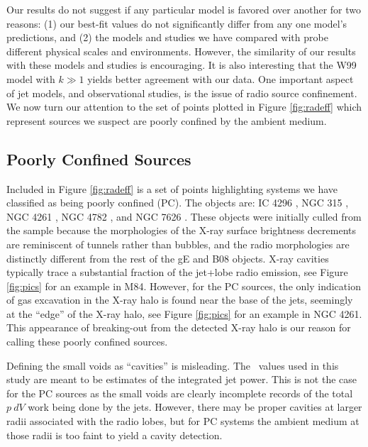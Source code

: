 \documentclass{emulateapj}
\begin{document}
Our results do not suggest if any particular model is favored over
another for two reasons: (1) our best-fit values do not significantly
differ from any one model's predictions, and (2) the models and
studies we have compared with probe different physical scales and
environments. However, the similarity of our results with these models
and studies is encouraging. It is also interesting that the W99 model
with $k \gg 1$ yields better agreement with our data. One important
aspect of jet models, and observational studies, is the issue of radio
source confinement. We now turn our attention to the set of points
plotted in Figure \ref{fig:radeff} which represent sources we suspect
are poorly confined by the ambient medium.

\subsection{Poorly Confined Sources}
\label{sec:jet}

Included in Figure \ref{fig:radeff} is a set of points highlighting
systems we have classified as being poorly confined (PC). The objects
are: IC 4296 \citep{1988ApJ...324..198K, 2003ApJ...585..677P}, NGC 315
\citep{1979ApJ...228L...9B, 1981A&A....95..250W}, NGC 4261
\citep{1997ApJ...484..186J, 2000ApJ...534..165J}, NGC 4782
\citep{2007ApJ...664..804M}, and NGC 7626 \citep{1985ApJ...291...32B}.
These objects were initially culled from the sample because the
morphologies of the X-ray surface brightness decrements are
reminiscent of tunnels rather than bubbles, and the radio morphologies
are distinctly different from the rest of the gE and B08
objects. X-ray cavities typically trace a substantial fraction of the
jet+lobe radio emission, see Figure \ref{fig:pics} for an example in
M84. However, for the PC sources, the only indication of gas
excavation in the X-ray halo is found near the base of the jets,
seemingly at the ``edge'' of the X-ray halo, see Figure \ref{fig:pics}
for an example in NGC 4261. This appearance of breaking-out from the
detected X-ray halo is our reason for calling these poorly confined
sources.

Defining the small voids as ``cavities'' is misleading. The
\pcav\ values used in this study are meant to be estimates of the
integrated jet power. This is not the case for the PC sources as the
small voids are clearly incomplete records of the total $p~dV$ work
being done by the jets. However, there may be proper cavities at
larger radii associated with the radio lobes, but for PC systems the
ambient medium at those radii is too faint to yield a cavity
detection.
\end{document}
